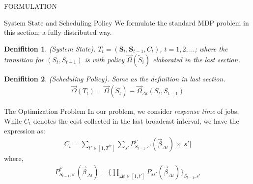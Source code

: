 \documentclass[10pt, conference, letterpaper]{IEEEtran}
\newtheorem{definition}{Denifition}
\newcommand{\Stat}{\mathbf{S}}
\begin{document}
    \begin{section}{FORMULATION}
        \label{sec:formulation}
        \begin{section}{System State and Scheduling Policy}
            We formulate the standard MDP problem in this section; a fully distributed way.

            \begin{definition}
                (System State).
                $T_t = (\Stat_t, \Stat_{t-1}, C_t)$, $t=1,2,\dots$; where the transition for $(S_{t}, S_{t-1})$ is with policy $\vec{\Omega}(\tilde{S}_i)$ elaborated in the last section.
            \end{definition}

            \begin{definition}
                (Scheduling Policy).
                Same as the definition in last section.
                \begin{align}
                    \vec{\Omega}(T_t) = \vec{\Omega}(\tilde{S}_t) \equiv \vec{\Omega}_{\Delta{t}}(S_t, S_{t-1})
                \end{align}
            \end{definition}
        \end{section}

        \begin{subsection}{The Optimization Problem}
            In our problem, we consider \emph{response time} of jobs;
            While $C_t$ denotes the cost collected in the last broadcast interval, we have the expression as:
            \begin{align}
                C_t = \sum_{t'\in[1,T^{br}]} \sum_{s'} P_{S_{t-1},s'}^{t'}(\vec{\beta}_{\Delta{t}}) \times |s'|
            \end{align}
            where,
            \begin{align}
                P_{S_{t-1},s'}^{t'}(\vec{\beta}_{\Delta{t}})
                = \{
                    \prod_{\Delta{t} \in [1,t']} P_{ss'}(\vec{\beta}_{\Delta{t}})
                \}_{S_{t-1}, s'}
            \end{align}
            

\end{subsection}
\end{section}
\end{document}
